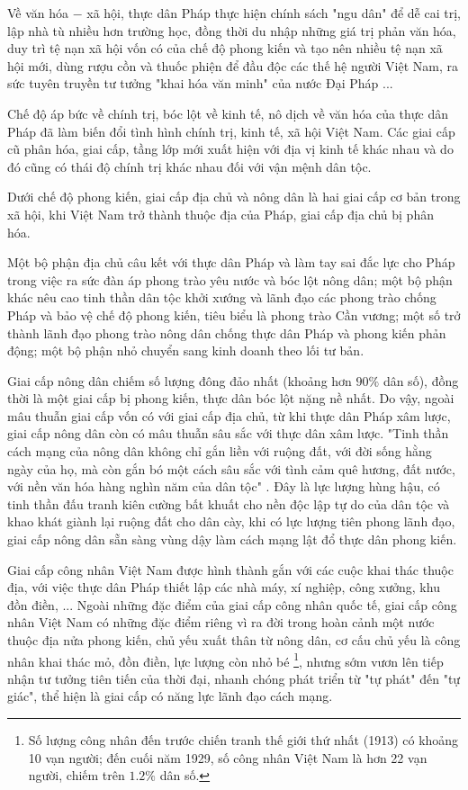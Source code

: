 Về văn hóa $-$ xã hội, thực dân Pháp thực hiện chính sách "ngu dân" để dễ cai trị, lập nhà tù nhiều hơn trường học, đồng thời du nhập những giá trị phản văn hóa, duy trì tệ nạn xã hội vốn có của chế độ phong kiến và tạo nên nhiều tệ nạn xã hội mới, dùng rượu cồn và thuốc phiện để đầu độc các thế hệ người Việt Nam, ra sức tuyên truyền tư tưởng "khai hóa văn minh" của nước Đại Pháp ...

Chế độ áp bức về chính trị, bóc lột về kinh tế, nô dịch về văn hóa của thực dân Pháp đã làm biến đổi tình hình chính trị, kinh tế, xã hội Việt Nam. Các giai cấp cũ phân hóa, giai cấp, tầng lớp mới xuất hiện với địa vị kinh tế khác nhau và do đó cũng có thái độ chính trị khác nhau đối với vận mệnh dân tộc.

Dưới chế độ phong kiến, giai cấp địa chủ và nông dân là hai giai cấp cơ bản trong xã hội, khi Việt Nam trở thành thuộc địa của Pháp, giai cấp địa chủ bị phân hóa.

Một bộ phận địa chủ câu kết với thực dân Pháp và làm tay sai đắc lực cho Pháp trong việc ra sức đàn áp phong trào yêu nước và bóc lột nông dân; một bộ phận khác nêu cao tinh thần dân tộc khởi xướng và lãnh đạo các phong trào chống Pháp và bảo vệ chế độ phong kiến, tiêu biểu là phong trào Cần vương; một số trở thành lãnh đạo phong trào nông dân chống thực dân Pháp và phong kiến phản động; một bộ phận nhỏ chuyển sang kinh doanh theo lối tư bản.

Giai cấp nông dân chiếm số lượng đông đảo nhất (khoảng hơn $90\%$ dân số), đồng thời là một giai cấp bị phong kiến, thực dân bóc lột nặng nề nhất. Do vậy, ngoài mâu thuẫn giai cấp vốn có với giai cấp địa chủ, từ khi thực dân Pháp xâm lược, giai cấp nông dân còn có mâu thuẫn sâu sắc với thực dân xâm lược. "Tinh thần cách mạng của nông dân không chỉ gắn liền với ruộng đất, với đời sống hằng ngày của họ, mà còn gắn bó một cách sâu sắc với tình cảm quê hương, đất nước, với nền văn hóa hàng nghìn năm của dân tộc" . Đây là lực lượng hùng hậu, có tinh thần đấu tranh kiên cường bất khuất cho nền độc lập tự do của dân tộc và khao khát giành lại ruộng đất cho dân cày, khi có lực lượng tiên phong lãnh đạo, giai cấp nông dân sẵn sàng vùng dậy làm cách mạng lật đổ thực dân phong kiến.

Giai cấp công nhân Việt Nam được hình thành gắn với các cuộc khai thác thuộc địa, với việc thực dân Pháp thiết lập các nhà máy, xí nghiệp, công xưởng, khu đồn điền, ... Ngoài những đặc điểm của giai cấp công nhân quốc tế, giai cấp công nhân Việt Nam có những đặc điểm riêng vì ra đời trong hoàn cảnh một nước thuộc địa nửa phong kiến, chủ yếu xuất thân từ nông dân, cơ cấu chủ yếu là công nhân khai thác mỏ, đồn điền, lực lượng còn nhỏ bé \footnote{Số lượng công nhân đến trước chiến tranh thế giới thứ nhất (1913) có khoảng 10 vạn người; đến cuối năm 1929, số công nhân Việt Nam là hơn 22 vạn người, chiếm trên $1.2\%$ dân số.}, nhưng sớm vươn lên tiếp nhận tư tưởng tiên tiến của thời đại, nhanh chóng phát triển từ "tự phát" đến "tự giác", thể hiện là giai cấp có năng lực lãnh đạo cách mạng.


